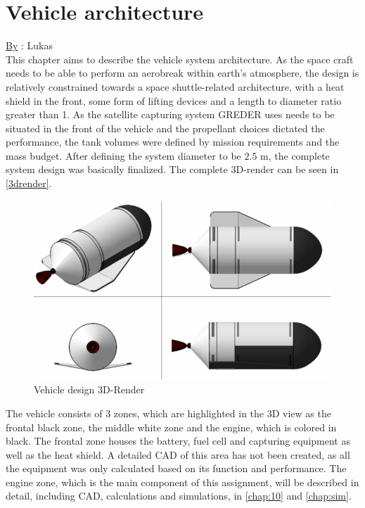 \chapter{Vehicle architecture}
\qquad \underline{By} : Lukas\\

This chapter aims to describe the vehicle system architecture. As the space craft needs to be able to perform an aerobreak within earth’s atmosphere, the design is relatively constrained towards a space shuttle-related architecture, with a heat shield in the front, some form of lifting devices and a length to diameter ratio greater than 1. As the satellite capturing system GREDER uses needs to be situated in the front of the vehicle and the propellant choices dictated the performance, the tank volumes were defined by mission requirements and the mass budget. After defining the system diameter to be $2.5$ m, the complete system design was basically finalized. The complete 3D-render can be seen in \autoref{3drender}.

\begin{figure}[H]
	\centering\includegraphics[width=\linewidth]{3drender}
	\caption{Vehicle design 3D-Render}\label{3drender}
\end{figure}

The vehicle consists of 3 zones, which are highlighted in the 3D view as the frontal black zone, the middle white zone and the engine, which is colored in black. The frontal zone houses the battery, fuel cell and capturing equipment as well as the heat shield. A detailed CAD of this area has not been created, as all the equipment was only calculated based on its function and performance. The engine zone, which is the main component of this assignment, will be described in detail, including CAD, calculations and simulations, in \autoref{chap:10} and \autoref{chap:sim}. \\

